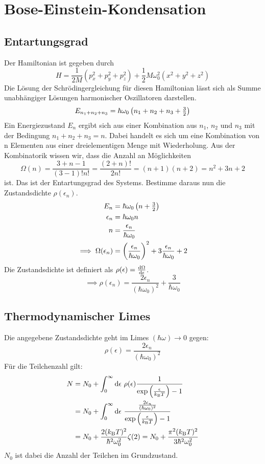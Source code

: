 \fehlt

\IfFileExists{\bibliographyfile}{
    \printbibliography
}{}


\section{Bose-Einstein-Kondensation}
\subsection{Entartungsgrad}
Der Hamiltonian ist gegeben durch
\[H = \frac{1}{2M}(p^2_x+p^2_y+p^2_z)+\frac{1}{2}M \omega^2_0(x^2+y^2+z^2) \]
Die Lösung der Schrödingergleichung für diesen Hamiltonian lässt sich als Summe unabhängiger Lösungen harmonischer Oszillatoren darstellen.
\[E_{n_1+n_2+n_3} = \hbar \omega_0 \del{n_1+n_2+n_3+\tfrac{3}{2}} \]
Ein Energiezustand $E_n$ ergibt sich aus einer Kombination aus $n_1$, $n_2$ und $n_3$ mit der Bedingung $n_1+n_2+n_3=n$. Dabei handelt es sich um eine Kombination von n Elementen aus einer dreielementigen Menge mit Wiederholung. Aus der Kombinatorik wissen wir, dass die Anzahl an Möglichkeiten
\[\Omega(n)=\frac{3+n-1}{(3-1)!n!}=\frac{(2+n)!}{2n!}=(n+1)(n+2)=n^2+3n+2 \]
ist. Das ist der Entartungsgrad des Systems. Bestimme daraus nun die Zustandsdichte $\rho(\epsilon_n)$.
\begin{align*}
E_n &= \hbar \omega_0 \del{n+ \tfrac{3}{2}} \\
\epsilon_n &= \hbar \omega_0 n \\
n &= \frac{\epsilon_n}{\hbar \omega_0} \\
\implies \Omega(\epsilon_n) &= \del{\frac{\epsilon_n}{\hbar \omega_0}}^2 +3\frac{\epsilon_n}{\hbar \omega_0}+2
\end{align*}
Die Zustandsdichte ist definiert als $\rho(\epsilon)=\frac{\dif \Omega}{\dif \epsilon}$.
\[ \implies \rho(\epsilon_n) = \frac{2\epsilon_n}{(\hbar \omega_0)^2} +\frac{3}{\hbar \omega_0} \]

\subsection{Thermodynamischer Limes}
Die angegebene Zustandsdichte geht im Limes $(\hbar \omega) \longrightarrow 0$ gegen:
\[\rho(\epsilon) = \frac{2\epsilon_n}{(\hbar \omega_0)^2} \]
Für die Teilchenzahl gilt:
\begin{align*}
N &= N_0 + \int_0^\infty \dif \epsilon \ \rho(\epsilon) \frac{1}{\exp\del{\frac{\epsilon}{k_\text{B} T}}-1} \\
&= N_0 + \int_0^\infty \dif \epsilon \  \frac{\frac{2\epsilon_n}{(\hbar \omega_0)^2}}{\exp\del{\frac{\epsilon}{k_\text{B} T}}-1} \\
&= N_0 + \frac{2(k_\text{B} T)^2}{\hbar^2 \omega_0^2} \zeta(2) = N_0 + \frac{\pi^2 (k_\text{B} T)^2}{3 \hbar^2 \omega_0^2}
\end{align*}
$N_0$ ist dabei die Anzahl der Teilchen im Grundzustand.

